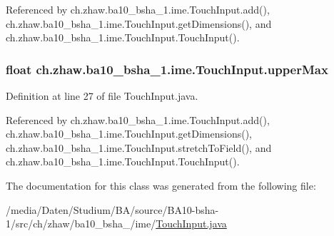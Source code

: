 Referenced by ch.zhaw.ba10\_\-bsha\_\-1.ime.TouchInput.add(), ch.zhaw.ba10\_\-bsha\_\-1.ime.TouchInput.getDimensions(), and ch.zhaw.ba10\_\-bsha\_\-1.ime.TouchInput.TouchInput().\hypertarget{classch_1_1zhaw_1_1ba10__bsha__1_1_1ime_1_1TouchInput_a30f650d3ad8ed1df80b13bf4b6a90ccd}{
\subsubsection[{upperMax}]{\setlength{\rightskip}{0pt plus 5cm}float {\bf ch.zhaw.ba10\_\-bsha\_\-1.ime.TouchInput.upperMax}}}
\label{classch_1_1zhaw_1_1ba10__bsha__1_1_1ime_1_1TouchInput_a30f650d3ad8ed1df80b13bf4b6a90ccd}


Definition at line 27 of file TouchInput.java.

Referenced by ch.zhaw.ba10\_\-bsha\_\-1.ime.TouchInput.add(), ch.zhaw.ba10\_\-bsha\_\-1.ime.TouchInput.getDimensions(), ch.zhaw.ba10\_\-bsha\_\-1.ime.TouchInput.stretchToField(), and ch.zhaw.ba10\_\-bsha\_\-1.ime.TouchInput.TouchInput().

The documentation for this class was generated from the following file:\begin{DoxyCompactItemize}
\item 
/media/Daten/Studium/BA/source/BA10-\/bsha-\/1/src/ch/zhaw/ba10\_\-bsha\_/ime/\hyperlink{TouchInput_8java}{TouchInput.java}\end{DoxyCompactItemize}

